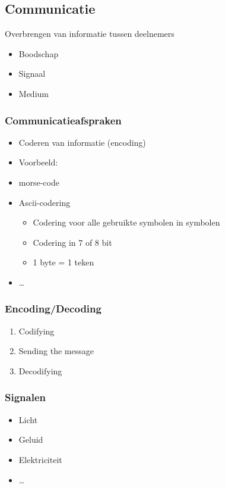 \documentclass{article}
\begin{document}
\subsection{Communicatie}
Overbrengen van informatie tussen deelnemers
\begin{itemize}
    \item Boodschap
    \item Signaal
    \item Medium
\end{itemize}

\subsubsection{Communicatieafspraken}
\begin{itemize}
    \item Coderen van informatie (encoding)
    \item Voorbeeld:
        \item morse-code
        \item Ascii-codering
        \begin{itemize}
            \item Codering voor alle gebruikte symbolen in symbolen
            \item Codering in 7 of 8 bit
            \item 1 byte = 1 teken
        \end{itemize}
        \item \dots
\end{itemize}
  
\subsubsection{Encoding/Decoding}
\begin{enumerate}
    \item Codifying
    \item Sending the message
    \item Decodifying
\end{enumerate}

\subsubsection{Signalen}
\begin{itemize}
    \item Licht
    \item Geluid
    \item Elektriciteit
    \item \dots
\end{itemize}
\end{document}
